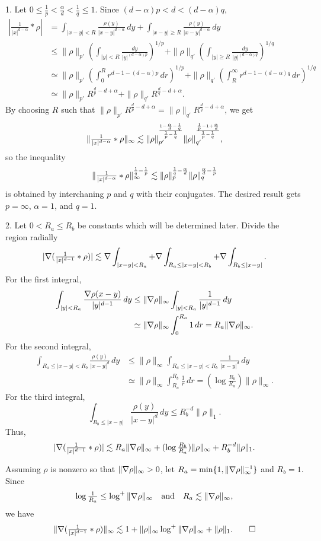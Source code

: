 \documentclass[11pt]{amsart}
\begin{document}
\begin{pf}
1.
Let $0\le\frac1p<\frac\alpha d<\frac1q\le1$.
Since $(d-\alpha)p<d<(d-\alpha)q$,
\begin{align*}
|\tfrac1{|x|^{d-\alpha}}*\rho|
&=\int_{|x-y|<R}\frac{\rho(y)}{|x-y|^{d-\alpha}}\,dy+\int_{|x-y|\ge R}\frac{\rho(y)}{|x-y|^{d-\alpha}}\,dy\\
&\le\|\rho\|_{p'}(\int_{|y|<R}\frac{dy}{|y|^{(d-\alpha)p}})^{1/p}+\|\rho\|_{q'}(\int_{|y|\ge R}\frac{dy}{|y|^{(d-\alpha)q}})^{1/q}\\
&\simeq\|\rho\|_{p'}(\int_0^Rr^{d-1-(d-\alpha)p}\,dr)^{1/p}+\|\rho\|_{q'}(\int_R^\infty r^{d-1-(d-\alpha)q}\,dr)^{1/q}\\
&\simeq\|\rho\|_{p'}R^{\frac dp-d+\alpha}+\|\rho\|_{q'}R^{\frac dq-d+\alpha}.
\end{align*}
By choosing $R$ such that $\|\rho\|_{p'}R^{\frac dp-d+\alpha}=\|\rho\|_{q'}R^{\frac dq-d+\alpha}$, we get
\[\|\tfrac1{|x|^{d-\alpha}}*\rho\|_\infty\lesssim\|\rho\|_{p'}^{\frac{1-\frac\alpha d-\frac1q}{\frac1p-\frac1q}}\|\rho\|_{q'}^{\frac{\frac1p-1+\frac\alpha d}{\frac1p-\frac1q}},\]
so the inequality
\[\|\tfrac1{|x|^{d-\alpha}}*\rho\|_\infty^{\frac1q-\frac1p}\lesssim\|\rho\|_p^{\frac1q-\frac\alpha d}\|\rho\|_q^{\frac\alpha d-\frac1p}\]
is obtained by interchaning $p$ and $q$ with their conjugates.
The desired result gets $p=\infty$, $\alpha=1$, and $q=1$.

2.
Let $0<R_a\le R_b$ be constants which will be determined later.
Divide the region radially
\begin{align*}
|\nabla(\tfrac1{|x|^{d-1}}*\rho)|\lesssim\nabla\int_{|x-y|<R_a}+\nabla\int_{R_a\le|x-y|<R_b}+\nabla\int_{R_b\le|x-y|}.
\end{align*}
For the first integral,
\begin{align*}
\int_{|y|<R_a}\frac{\nabla\rho(x-y)}{|y|^{d-1}}\,dy
&\le\|\nabla\rho\|_\infty\int_{|y|<R_a}\frac1{|y|^{d-1}}\,dy\\
&\simeq\|\nabla\rho\|_\infty\int_0^{R_a}1\,dr
=R_a\|\nabla\rho\|_\infty.
\end{align*}
For the second integral,
\begin{align*}
\int_{R_a\le|x-y|<R_b}\frac{\rho(y)}{|x-y|^d}\,dy
&\le\|\rho\|_\infty\int_{R_a\le|x-y|<R_b}\frac1{|x-y|^d}\,dy\\
&\simeq\|\rho\|_\infty\int_{R_a}^{R_b}\frac1r\,dr
=(\log\tfrac{R_b}{R_a})\|\rho\|_\infty.
\end{align*}
For the third integral,
\[\int_{R_b\le|x-y|}\frac{\rho(y)}{|x-y|^d}\,dy\le R_b^{-d}\|\rho\|_1.\]
Thus,
\[|\nabla(\tfrac1{|x|^{d-1}}*\rho)|\lesssim R_a\|\nabla\rho\|_\infty+(\log\tfrac{R_b}{R_a})\|\rho\|_\infty+R_b^{-d}\|\rho\|_1.\]

Assuming $\rho$ is nonzero so that $\|\nabla\rho\|_\infty>0$, let $R_a=\min\{1,\|\nabla\rho\|_\infty^{-1}\}$ and $R_b=1$.
Since
\[\log\tfrac1{R_a}\le\log^+\|\nabla\rho\|_\infty\quad\text{and}\quad R_a\lesssim\|\nabla\rho\|_\infty,\]
we have
\[\|\nabla(\tfrac1{|x|^{d-1}}*\rho)\|_\infty\lesssim1+\|\rho\|_\infty\log^+\|\nabla\rho\|_\infty+\|\rho\|_1.\qedhere\]
\end{pf}
\end{document}
